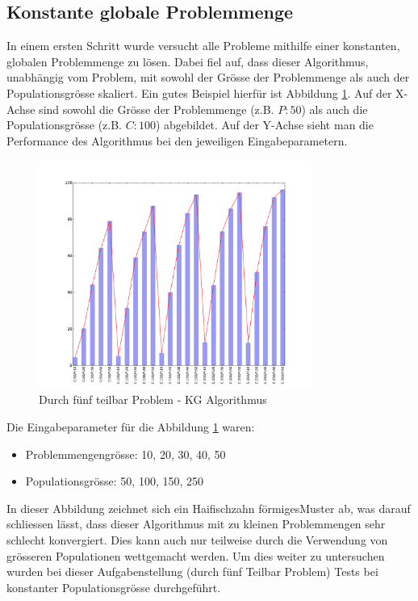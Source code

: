 \subsection{Konstante globale Problemmenge}
In einem ersten Schritt wurde versucht alle Probleme mithilfe einer konstanten, globalen Problemmenge zu lösen. Dabei fiel auf, dass dieser Algorithmus, unabhängig vom Problem, mit sowohl der Grösse der Problemmenge als auch der Populationsgrösse skaliert. Ein gutes Beispiel hierfür ist Abbildung \ref{fig:c_g_div5}. Auf der X-Achse sind sowohl die Grösse der Problemmenge (z.B. $P:50$) als auch die Populationsgrösse (z.B. $C:100$) abgebildet. Auf der Y-Achse sieht man die Performance des Algorithmus bei den jeweiligen Eingabeparametern.

\begin{figure}[h]
  \centering
  \includegraphics[width=0.8\textwidth]{images/C_G_div5_solved.pdf}
  \caption[Durch fünf teilbar Problem - KG Algorithmus]{Durch fünf teilbar Problem - KG Algorithmus}
  \label{fig:c_g_div5}
\end{figure}

Die Eingabeparameter für die Abbildung \ref{fig:c_g_div5} waren:
\begin{itemize}
	\item Problemmengengrösse: 10, 20, 30, 40, 50
	\item Populationsgrösse: 50, 100, 150, 250
\end{itemize}

In dieser Abbildung zeichnet sich ein \flqq Haifischzahn förmiges\frqq Muster ab, was darauf schliessen lässt, dass dieser Algorithmus mit zu kleinen Problemmengen sehr schlecht konvergiert. Dies kann auch nur teilweise durch die Verwendung von grösseren Populationen wettgemacht werden. Um dies weiter zu untersuchen wurden bei dieser Aufgabenstellung (\flqq durch fünf Teilbar Problem\frqq) Tests bei konstanter Populationsgrösse durchgeführt. 

